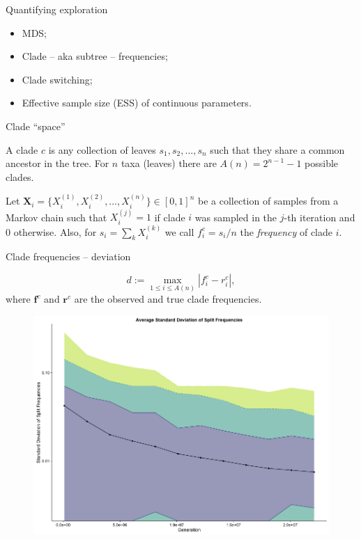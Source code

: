\documentclass[newPxFont,numfooter,sectionpages]{beamer}
\begin{document}
\begin{frame}{Quantifying exploration}
\begin{itemize}
 \item MDS;
 \item Clade -- aka subtree -- frequencies;
 \item Clade switching;
 \item Effective sample size (ESS) of continuous parameters.
\end{itemize}
\end{frame}

\begin{frame}{Clade ``space''}

A clade $c$ is any collection of leaves $s_1, s_2, \ldots, s_n$ such that they share a common ancestor in the tree.
For $n$ taxa (leaves) there are $A(n) = 2^{n-1} -1$ possible clades. 

Let $\boldsymbol X_i = \{X_i^{(1)}, X_i^{(2)}, \ldots, X_i^{(n)}\} \in [0, 1]^n$ be a collection of samples from a Markov chain such that $X^{(j)}_i = 1$ if clade $i$ was sampled in the $j$-th iteration and $0$ otherwise.
Also, for $s_i = \sum_k X_i^{(k)}$ we call $f_i^c = s_i/n$ the \textit{frequency} of clade $i$.

\end{frame}

\begin{frame}{Clade frequencies -- deviation}

\[ d := \max_{1 \leq i \leq A(n)} |f^c_i - r^c_i|, \]
where $\boldsymbol f^c$ and $\boldsymbol r^c$ are the observed and true clade frequencies.

\begin{figure}
	\includegraphics[scale=0.25]{figures/asdsf.png} 
\end{figure}
\end{frame}
\end{document}
